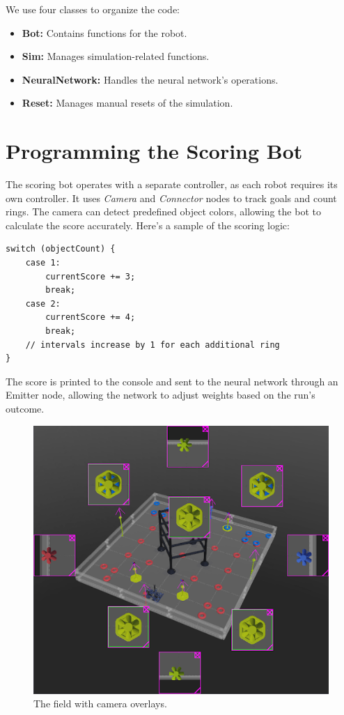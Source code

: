 We use four classes to organize the code:
\begin{itemize}
    \item \textbf{Bot:} Contains functions for the robot.
    \item \textbf{Sim:} Manages simulation-related functions.
    \item \textbf{NeuralNetwork:} Handles the neural network’s operations.
    \item \textbf{Reset:} Manages manual resets of the simulation.
\end{itemize}

\section*{Programming the Scoring Bot}
The scoring bot operates with a separate controller, as each robot requires its own controller. It uses \textit{Camera} and \textit{Connector} nodes to track goals and count rings. The camera can detect predefined object colors, allowing the bot to calculate the score accurately. Here’s a sample of the scoring logic:

\begin{verbatim}
switch (objectCount) {
    case 1:
        currentScore += 3;
        break;
    case 2:
        currentScore += 4;
        break;
    // intervals increase by 1 for each additional ring
}
\end{verbatim}

The score is printed to the console and sent to the neural network through an Emitter node, allowing the network to adjust weights based on the run’s outcome.

\begin{figure}[h]
    \includegraphics[width=0.9\linewidth]{images/simfield.png}
    \centering
    \caption{The field with camera overlays.}
    \label{Fig:simfield}
\end{figure}

